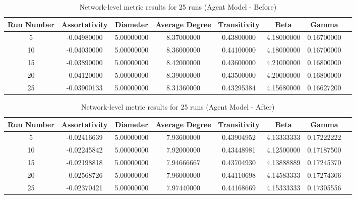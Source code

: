 \documentclass[12pt,a4paper]{thesis}
\begin{document}
\begin{appendices}
\begin{table}[H]
\centering
\caption{Network-level metric results for 25 runs (Agent Model - Before)}
\tiny
\begin{tabular}{|c|c|c|c|c|c|c|c|}
\hline Run Number & Assortativity & Diameter & Average Degree & Transitivity & Beta & Gamma \\ 
\hline	5	&	-0.04980000	&	5.00000000	&	8.37000000	&	0.43800000	&	4.18000000	&	0.16700000	\\
\hline	10	&	-0.04030000	&	5.00000000	&	8.36000000	&	0.44100000	&	4.18000000	&	0.16700000	\\
\hline	15	&	-0.03890000	&	5.00000000	&	8.42000000	&	0.43600000	&	4.21000000	&	0.16800000	\\
\hline	20	&	-0.04120000	&	5.00000000	&	8.39000000	&	0.43500000	&	4.20000000	&	0.16800000	\\
\hline	25	&	-0.03900133	&	5.00000000	&	8.31360000	&	0.43295384	&	4.15680000	&	0.16627200	\\
\hline 
\end{tabular}
\label{tab:ConvergeAgentB} 
\end{table}

\begin{table}[H]
\centering
\caption{Network-level metric results for 25 runs (Agent Model - After)}
\tiny
\begin{tabular}{|c|c|c|c|c|c|c|c|}
\hline Run Number & Assortativity & Diameter & Average Degree & Transitivity & Beta & Gamma \\ 
\hline	5 &	-0.02416639	&	5.00000000	&	7.93600000	&	0.43904952 &	4.13333333	&	0.17222222	\\
\hline	10 & -0.02245842	&	5.00000000	&	7.92000000	&	0.43448981	&	4.12500000	&	0.17187500	\\
\hline	15 & -0.02198818	&	5.00000000	&	7.94666667	&	0.43704930	&	4.13888889	&	0.17245370	\\
\hline	20 & -0.02568726	&	5.00000000	&	7.96000000	&	0.44110698	&	4.14583333	&	0.17274306	\\
\hline	25 & -0.02370421	&	5.00000000	&	7.97440000	&	0.44168669	&	4.15333333	&	0.17305556	\\
\hline 
\end{tabular}
\label{tab:ConvergeAgentA} 
\end{table}

\end{appendices}
\end{document}
